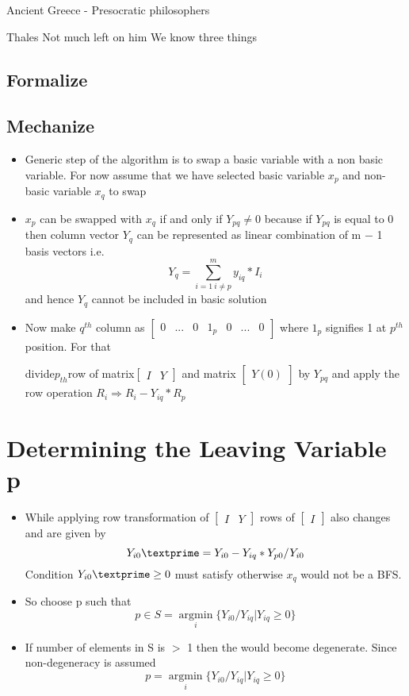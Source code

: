 \documentclass[twoside]{article}
\begin{document}
Ancient Greece - Presocratic philosophers

Thales
Not much left on him
We know three things

\subsection{Formalize}

\subsection{Mechanize}


\begin{itemize}
\item Generic step of the algorithm is to swap a basic variable with a non basic variable. For now assume
that we have selected basic variable $x_p$ and non-basic variable $x_q$ to swap
\item $x_p$ can be swapped with $x_q$ if and only if $Y_{pq} \ne 0$ because if $Y_{pq}$ is equal to 0 then column vector $Y_q$
can be represented as linear combination of m − 1 basis vectors i.e.
\[ Y_q=\sum_{i=1~i \neq p}^m y_{iq} \ast I_i\]
and hence $Y_q$ cannot be included in basic solution
\item Now make $q^{th}$ column as $ \left[ \begin{array}{ccccccc}
 0 & ... & 0 & 1_p & 0 & ... & 0
  \end{array} \right]$ where $1_p$
  signifies 1 at
  $p^{th}$
  position. For that

 divide$p_{th}$row of matrix$ \left[ \begin{array}{cc}
I &
Y  \end{array} \right]$
and matrix $ \left[ \begin{array}{cc}
Y(0) \end{array} \right]$
by
$Y_{pq}$ and apply the row operation $R_i \Rightarrow R_i - Y_{iq} \ast R_p$
\end{itemize}
\section{Determining the Leaving Variable p}
\begin{itemize}
\item While applying row transformation of
$ \left[ \begin{array}{cc}
I &
Y  \end{array} \right]$ rows of $ \left[ \begin{array}{c}
I  \end{array} \right]$ also changes and are given by
\[Y_{i0}\textprime =Y_{i0}-Y_{iq}\ast Y_{p0} / Y_{i0} \]
Condition $Y_{i0}\textprime \ge 0 $ must satisfy otherwise $x_q$ would not be a BFS.
\item So choose p such that
\[p \in S = \underset{i}{\operatorname{argmin}} \{Y_{i0}/Y_{iq} | Y_{iq} \ge 0\}\]
\item If number of elements in S is $>$ 1 then the would become degenerate. Since non-degeneracy is assumed
\[p = \underset{i}{\operatorname{argmin}}\{Y_{i0}/Y_{iq} | Y_{iq} \ge 0\}\]
\end{itemize}
\end{document}
